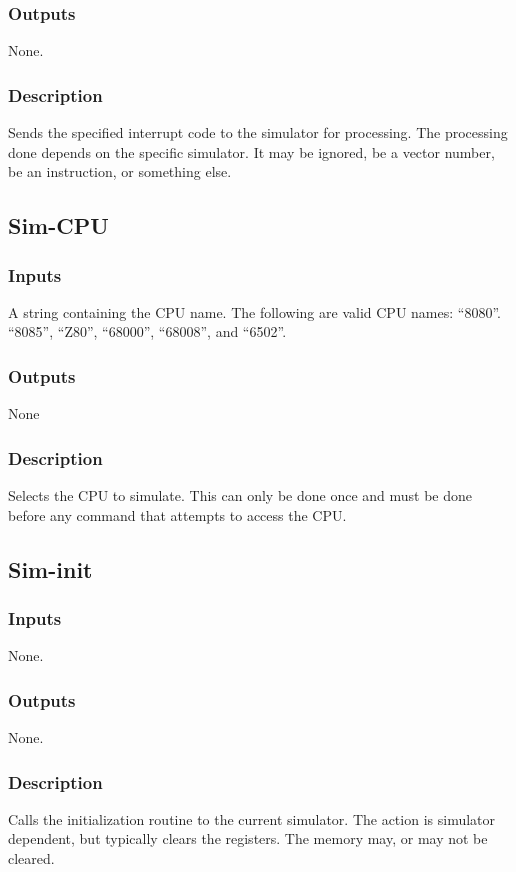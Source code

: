 \documentclass[10pt, openany]{book}
\begin{document}
\subsubsection{Outputs}
None.
\subsubsection{Description}
Sends the specified interrupt code to the simulator for processing.  The processing done depends on the specific simulator.  It may be ignored, be a vector number, be an instruction, or something else.

\subsection{Sim-CPU}
\subsubsection{Inputs}
A string containing the CPU name.  The following are valid CPU names:  ``8080''. ``8085'', ``Z80'', ``68000'', ``68008'', and ``6502''.
\subsubsection{Outputs}
None
\subsubsection{Description}
Selects the CPU to simulate.  This can only be done once and must be done before any command that attempts to access the CPU.

\subsection{Sim-init}
\subsubsection{Inputs}
None.
\subsubsection{Outputs}
None.
\subsubsection{Description}
Calls the initialization routine to the current simulator.  The action is simulator dependent, but typically clears the registers.  The memory may, or may not be cleared.
\end{document}
